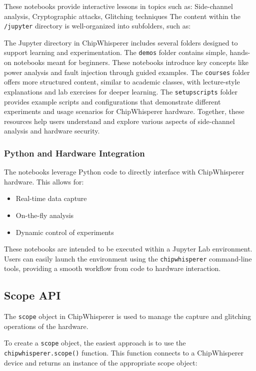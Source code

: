 These notebooks provide interactive lessons in topics such as: Side-channel analysis, Cryptographic attacks, Glitching techniques
The content within the \texttt{/jupyter} directory is well-organized into subfolders, such as:

The Jupyter directory in ChipWhisperer includes several folders designed to support learning and experimentation. The \texttt{demos} folder contains simple, hands-on notebooks meant for beginners. These notebooks introduce key concepts like power analysis and fault injection through guided examples. The \texttt{courses} folder offers more structured content, similar to academic classes, with lecture-style explanations and lab exercises for deeper learning. The \texttt{setupscripts} folder provides example scripts and configurations that demonstrate different experiments and usage scenarios for ChipWhisperer hardware. Together, these resources help users understand and explore various aspects of side-channel analysis and hardware security.


\subsubsection{Python and Hardware Integration}

The notebooks leverage Python code to directly interface with ChipWhisperer hardware. This allows for:

\begin{itemize}
    \item Real-time data capture
    \item On-the-fly analysis
    \item Dynamic control of experiments
\end{itemize}
These notebooks are intended to be executed within a Jupyter Lab environment. Users can easily launch the environment using the \texttt{chipwhisperer} command-line tools, providing a smooth workflow from code to hardware interaction.

\subsection{Scope API}
The \texttt{scope} object in ChipWhisperer is used to manage the capture and glitching operations of the hardware.

To create a \texttt{scope} object, the easiest approach is to use the 
\texttt{chipwhisperer.scope()} function. This function connects to a ChipWhisperer device and returns an instance of the appropriate scope object:

